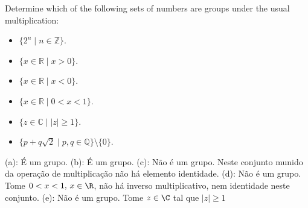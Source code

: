 \begin{exercicio}{1.56}
	Determine which of the following sets of numbers are groups under the usual multiplication:

	\begin{itemize}
		\item[(a)] $\{ 2^n \mid n \in \mathbb{Z} \}$.
		\item[(b)] $\{ x \in \mathbb{R} \mid x > 0 \}$.
		\item[(c)] $\{ x \in \mathbb{R} \mid x < 0 \}$.
		\item[(d)] $\{ x \in \mathbb{R} \mid 0 < x < 1 \}$.
		\item[(e)] $\{ z \in \mathbb{C} \mid |z| \geq 1 \}$.	
		\item[(f)] $\{ p + q \sqrt{2} \mid p, q \in \mathbb{Q} \} \setminus \{0\}$.
	\end{itemize}
\end{exercicio}

\begin{solucao}
	(a): É um grupo.
	(b): É um grupo.
	(c): Não é um grupo. Neste conjunto munido da operação de multiplicação não há elemento identidade.
	(d): Não é um grupo. Tome \(0 < x < 1, \, x \in \R\), não há inverso multiplicativo, nem identidade neste conjunto.
	(e): Não é um grupo. Tome \(z \in \C\) tal que \(|z| \geq 1\)
\end{solucao}